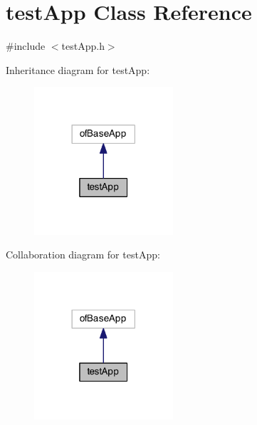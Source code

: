 \hypertarget{classtest_app}{\section{test\-App Class Reference}
\label{classtest_app}
}


{\ttfamily \#include $<$test\-App.\-h$>$}



Inheritance diagram for test\-App\-:\nopagebreak
\begin{figure}[H]
\begin{center}
\leavevmode
\includegraphics[width=146pt]{classtest_app__inherit__graph}
\end{center}
\end{figure}


Collaboration diagram for test\-App\-:\nopagebreak
\begin{figure}[H]
\begin{center}
\leavevmode
\includegraphics[width=146pt]{classtest_app__coll__graph}
\end{center}
\end{figure}
